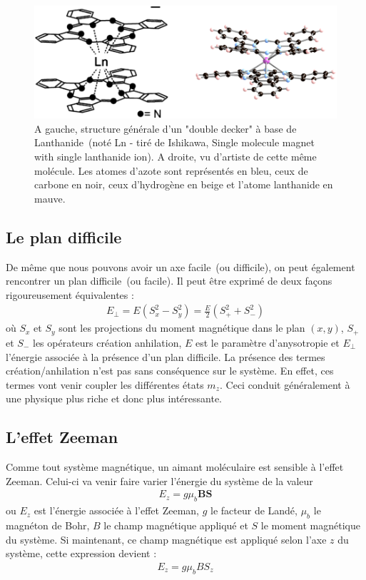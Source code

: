 \begin{figure}
\centering \includegraphics[scale=0.3]{Theorie/MagMol/figure2/figure2.png} 
\caption{A gauche, structure générale d'un "double decker" à base de Lanthanide~(noté Ln - tiré de Ishikawa, Single molecule magnet with single lanthanide ion). A droite, vu d'artiste de cette m\^eme molécule. Les atomes d'azote sont représentés en bleu, ceux de carbone en noir, ceux d'hydrogène en beige et l'atome lanthanide en mauve.}
\label{TbPc2}
\end{figure}

\subsection{Le plan difficile}
De m\^eme que nous pouvons avoir un axe facile~(ou difficile), on peut également rencontrer un plan difficile~(ou facile). Il peut \^etre exprimé de deux façons rigoureusement équivalentes :
\begin{eqnarray}
E_{\perp} = E ( S_x^2 -S_y^2)  = \frac{E}{2} ( S_+^2  + S_-^2) \nonumber 
\end{eqnarray}
où $S_x$ et $S_y$ sont les projections du moment magnétique dans le plan $(x,y)$, $S_+$ et $S_-$ les opérateurs création anhilation, $E$ est le paramètre d'anysotropie et $E_{\perp}$ l'énergie associée à la présence d'un plan difficile. La présence des termes création/anhilation n'est pas sans conséquence sur le système. En effet, ces termes vont venir coupler les différentes états $m_z$. Ceci conduit généralement à une physique plus riche et donc plus intéressante.

\subsection{L'effet Zeeman}
Comme tout système magnétique, un aimant moléculaire est sensible à l'effet Zeeman. Celui-ci va venir faire varier l'énergie du système de la valeur
\begin{eqnarray}
E_{z}= g\mu_b \mathbf{BS} \nonumber
\end{eqnarray}
ou $E_{z}$ est l'énergie associée à l'effet Zeeman, $g$ le facteur de Landé, $\mu_b$ le magnéton de Bohr, $B$ le champ magnétique appliqué et $S$ le moment magnétique du système. Si maintenant, ce champ magnétique est appliqué selon l'axe $z$ du système, cette expression devient :
\begin{eqnarray}
E_{z}= g\mu_b B S_z \nonumber
\end{eqnarray}

